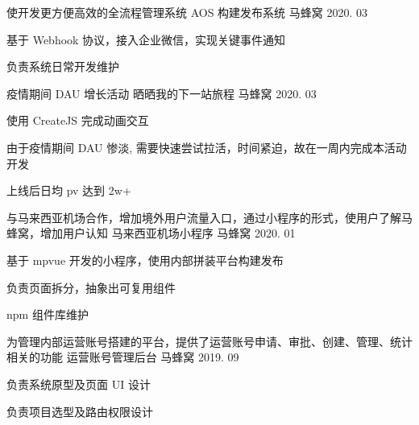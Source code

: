 

\begin{cventries}


  \cventry
  {使开发更方便高效的全流程管理系统} %
  {AOS 构建发布系统} %
  {马蜂窝} %
  {2020. 03} %
  {
    \begin{cvitems} %
      \item {基于 Webhook 协议，接入企业微信，实现关键事件通知}
      \item {负责系统日常开发维护}
    \end{cvitems}
  }

  \cventry
  {疫情期间 DAU 增长活动} %
  {晒晒我的下一站旅程} %
  {马蜂窝} %
  {2020. 03} %
  {
    \begin{cvitems} %
      \item {使用 CreateJS 完成动画交互}
      \item {由于疫情期间 DAU 惨淡, 需要快速尝试拉活，时间紧迫，故在一周内完成本活动开发}
      \item {上线后日均 pv 达到 2w+}
    \end{cvitems}
  }

  \cventry
  {与马来西亚机场合作，增加境外用户流量入口，通过小程序的形式，使用户了解马蜂窝，增加用户认知} %
  {马来西亚机场小程序} %
  {马蜂窝} %
  {2020. 01} %
  {
    \begin{cvitems} %
      \item {基于 mpvue 开发的小程序，使用内部拼装平台构建发布}
      \item {负责页面拆分，抽象出可复用组件}
      \item {npm 组件库维护}
    \end{cvitems}
  }


  \cventry
  {为管理内部运营账号搭建的平台，提供了运营账号申请、审批、创建、管理、统计相关的功能} %
  {运营账号管理后台} %
  {马蜂窝} %
  {2019. 09} %
  {
    \begin{cvitems} %
      \item {负责系统原型及页面 UI 设计}
      \item {负责项目选型及路由权限设计}
    \end{cvitems}
  }


\end{cventries}
